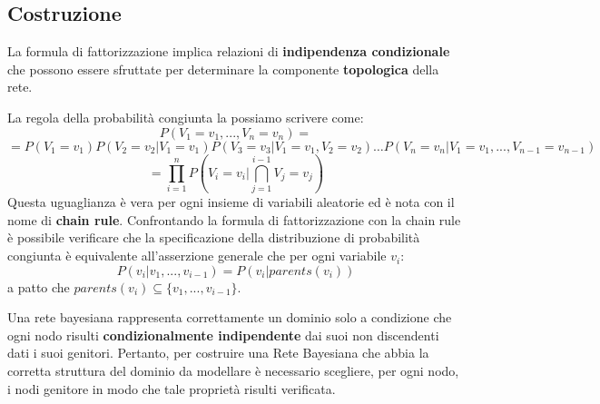 \subsection{Costruzione}
La formula di fattorizzazione implica relazioni di \textbf{indipendenza condizionale}
che possono essere sfruttate per determinare la componente \textbf{topologica} della rete.

La regola della probabilità congiunta la possiamo scrivere come:
\begin{equation*}
    P(V_1= v_1,...,V_n = v_n) = 
\end{equation*}
\begin{equation*}
    =P(V_1=v_1)P(V_2=v_2|V_1=v_1)P(V_3 =v_3|V_1=v_1,V_2=v_2)\dots P(V_n=v_n|V_1=v_1,...,V_{n-1}=v_{n-1})
\end{equation*}
\begin{equation*}
    =\prod_{i=1}^{n} P(V_i=v_i|\bigcap_{j=1} ^{i-1} V_j= v_j)
\end{equation*}
Questa uguaglianza è vera per ogni insieme di variabili aleatorie ed è nota con
il nome di \textbf{chain rule}. Confrontando la formula di fattorizzazione con
la chain rule è possibile verificare che la specificazione della distribuzione
di probabilità congiunta è equivalente all'asserzione generale che per ogni
variabile $v_i$:
\begin{equation}
    P(v_i|v_1,...,v_{i-1}) = P(v_i|parents(v_i))
\end{equation}
a patto che $parents(v_i) \subseteq \{v_1,...,v_{i-1}\}$.

Una rete bayesiana rappresenta correttamente un dominio solo a condizione che ogni
nodo risulti \textbf{condizionalmente indipendente} dai suoi non discendenti dati i suoi
genitori. Pertanto, per costruire una Rete Bayesiana che abbia la corretta
struttura del dominio da modellare è necessario scegliere, per ogni nodo, i nodi
genitore in modo che tale proprietà risulti verificata.

